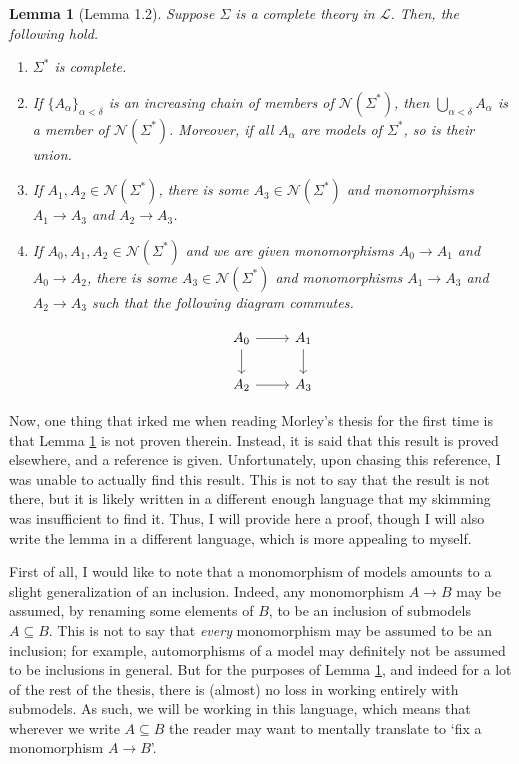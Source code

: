 \documentclass{article}
\newtheorem{lemma}[theorem]{Lemma}
\theoremstyle{nonumberplain}
\newcommand{\Lang}{\mathcal{L}}
\newcommand{\calN}{\mathcal{N}}
\begin{document}
\begin{lemma}[Lemma 1.2]\label{lem:1.2}
Suppose $\Sigma$ is a complete theory in $\Lang$. Then, the following hold.
\begin{enumerate}
\item\label{item:1.2:1} $\Sigma^*$ is complete.
\item\label{item:1.2:2} If $\{A_\alpha\}_{\alpha < \delta}$ is an increasing chain of members of $\calN(\Sigma^*)$, then $\bigcup_{\alpha < \delta} A_\alpha$ is a member of $\calN(\Sigma^*)$. Moreover, if all $A_\alpha$ are models of $\Sigma^*$, so is their union.
\item\label{item:1.2:3} If $A_1, A_2 \in \calN(\Sigma^*)$, there is some $A_3 \in \calN(\Sigma^*)$ and monomorphisms $A_1 \to A_3$ and $A_2 \to A_3$.
\item\label{item:1.2:4} If $A_0, A_1, A_2 \in \calN(\Sigma^*)$ and we are given monomorphisms $A_0 \to A_1$ and $A_0 \to A_2$, there is some $A_3 \in \calN(\Sigma^*)$ and monomorphisms $A_1 \to A_3$ and $A_2 \to A_3$ such that the following diagram commutes.

\begin{equation}
\begin{tikzcd}
A_0 \arrow[r] \arrow[d] & A_1 \arrow[d] \\
A_2 \arrow[r]           & A_3          
\end{tikzcd}
\end{equation}
\end{enumerate}
\end{lemma}

Now, one thing that irked me when reading Morley's thesis for the first time is that Lemma \ref{lem:1.2} is not proven therein. Instead, it is said that this result is proved elsewhere, and a reference is given. Unfortunately, upon chasing this reference, I was unable to actually find this result. This is not to say that the result is not there, but it is likely written in a different enough language that my skimming was insufficient to find it. Thus, I will provide here a proof, though I will also write the lemma in a different language, which is more appealing to myself.

First of all, I would like to note that a monomorphism of models amounts to a slight generalization of an inclusion. Indeed, any monomorphism $A \to B$ may be assumed, by renaming some elements of $B$, to be an inclusion of submodels $A \subseteq B$. This is not to say that \emph{every} monomorphism may be assumed to be an inclusion; for example, automorphisms of a model may definitely not be assumed to be inclusions in general. But for the purposes of Lemma \ref{lem:1.2}, and indeed for a lot of the rest of the thesis, there is (almost) no loss in working entirely with submodels. As such, we will be working in this language, which means that wherever we write $A \subseteq B$ the reader may want to mentally translate to `fix a monomorphism $A \to B$'.
\end{document}
